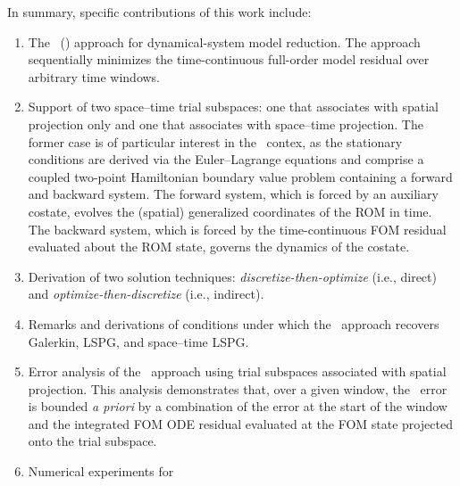 \documentclass[3p,computermodern,10pt]{elsarticle}
\begin{document}
 In summary, specific contributions of this work include:
\begin{enumerate}
\item The \methodNameLower\ (\methodAcronym) approach for dynamical-system
	model reduction. The approach sequentially minimizes the time-continuous
		full-order model residual over arbitrary time windows.
\item Support of two space--time trial subspaces: one that associates with spatial projection only and 
    one that associates with space--time projection.
The former case is of particular
		interest in the \methodAcronym\  contex, as the stationary conditions are
		derived via the Euler--Lagrange equations and comprise a coupled two-point
		Hamiltonian boundary value problem containing a forward and backward
		system. The forward system, which is forced by an auxiliary costate,
		evolves the (spatial) generalized coordinates of the ROM in time. The
		backward system, which is forced by the time-continuous FOM residual
		evaluated about the ROM state, governs the dynamics of the costate. 
	\item Derivation of two solution techniques:
		\textit{discretize-then-optimize} (i.e., direct) and
		\textit{optimize-then-discretize} (i.e., indirect). 
	\item Remarks and derivations of conditions under which the
		\methodAcronym\ approach recovers Galerkin, LSPG, and space--time LSPG.
\item Error analysis of the \methodAcronym\ approach using
	trial subspaces associated with spatial projection.
	This analysis demonstrates that, over a given window, the \methodAcronymROMs\ error 
		is bounded \textit{a priori} by a combination of the
		error at the start of the window and the integrated FOM ODE residual
		evaluated at the FOM state projected onto the trial subspace. 
\item Numerical experiments for 

\end{enumerate}
\end{document}

